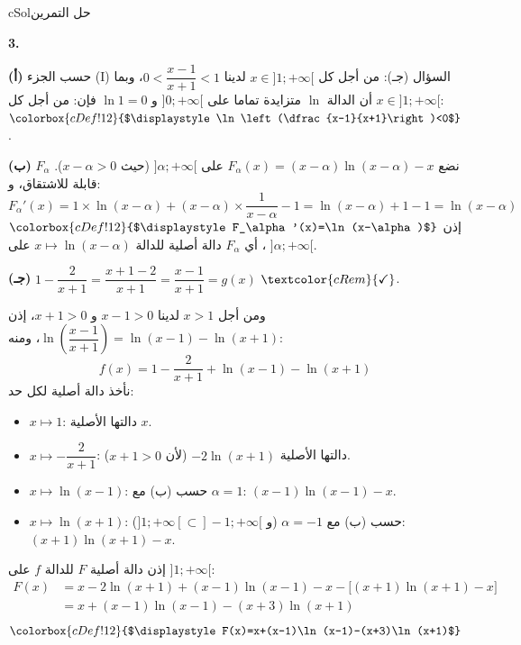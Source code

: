 \documentclass[12pt,a4paper]{article}
\newcounter{exo}
\newenvironment{hal}{\Needspace{12\baselineskip}\begin{otherlanguage}{english}\begin{arbox}[breakable]{cSol}{حل التمرين \theexo}}{\end{arbox}\end{otherlanguage}}
\newcommand{\bx}[1]{\ensuremath{\colorbox{cDef!12}{$\displaystyle #1$}}}
\newcommand{\ok}{$\textcolor{cRem}{\checkmark}$}
\newcommand{\pa}{\par\smallskip\textbf{(أ)} }\newcommand{\pb}{\par\smallskip\textbf{(ب)} }\newcommand{\pc}{\par\smallskip\textbf{(جـ)} }\newcommand{\pd}{\par\smallskip\textbf{(د)} }\newcommand{\pe}{\par\smallskip\textbf{(هـ)} }
\newcommand{\QQ}[1]{\par\smallskip\textbf{#1.} }
\begin{document}
\begin{hal}
\QQ{3}
\pa حسب الجزء (I) السؤال (جـ): من أجل كل $x\in]1;+\infty[$ لدينا $0<\dfrac{x-1}{x+1}<1$، وبما أن الدالة $\ln$ متزايدة تماما على $]0;+\infty[$ و $\ln 1=0$ فإن:
من أجل كل $x\in]1;+\infty[$: \bx{\ln\left(\dfrac{x-1}{x+1}\right)<0}.

\pb نضع $F_\alpha(x)=(x-\alpha)\ln(x-\alpha)-x$ على $]\alpha;+\infty[$ (حيث $x-\alpha>0$). $F_\alpha$ قابلة للاشتقاق، و:
\[F_\alpha'(x)=1\times\ln(x-\alpha)+(x-\alpha)\times\frac{1}{x-\alpha}-1=\ln(x-\alpha)+1-1=\ln(x-\alpha)\]
إذن \bx{F_\alpha'(x)=\ln(x-\alpha)}، أي $F_\alpha$ دالة أصلية للدالة $x\mapsto\ln(x-\alpha)$ على $]\alpha;+\infty[$.

\pc $1-\dfrac{2}{x+1}=\dfrac{x+1-2}{x+1}=\dfrac{x-1}{x+1}=g(x)$ \ok.

ومن أجل $x>1$ لدينا $x-1>0$ و $x+1>0$، إذن $\ln\left(\dfrac{x-1}{x+1}\right)=\ln(x-1)-\ln(x+1)$، ومنه:
\[f(x)=1-\frac{2}{x+1}+\ln(x-1)-\ln(x+1)\]
نأخذ دالة أصلية لكل حد:
\begin{itemize}
\item $x\mapsto 1$: دالتها الأصلية $x$.
\item $x\mapsto -\dfrac{2}{x+1}$: دالتها الأصلية $-2\ln(x+1)$ (لأن $x+1>0$).
\item $x\mapsto \ln(x-1)$: حسب (ب) مع $\alpha=1$: $(x-1)\ln(x-1)-x$.
\item $x\mapsto \ln(x+1)$: حسب (ب) مع $\alpha=-1$ (و $]1;+\infty[\subset]-1;+\infty[$): $(x+1)\ln(x+1)-x$.
\end{itemize}
إذن دالة أصلية $F$ للدالة $f$ على $]1;+\infty[$:
\begin{align*}
F(x)&=x-2\ln(x+1)+(x-1)\ln(x-1)-x-\big[(x+1)\ln(x+1)-x\big]\\
&=x+(x-1)\ln(x-1)-(x+3)\ln(x+1)
\end{align*}
\[\bx{F(x)=x+(x-1)\ln(x-1)-(x+3)\ln(x+1)}\]
\end{hal}
\end{document}
